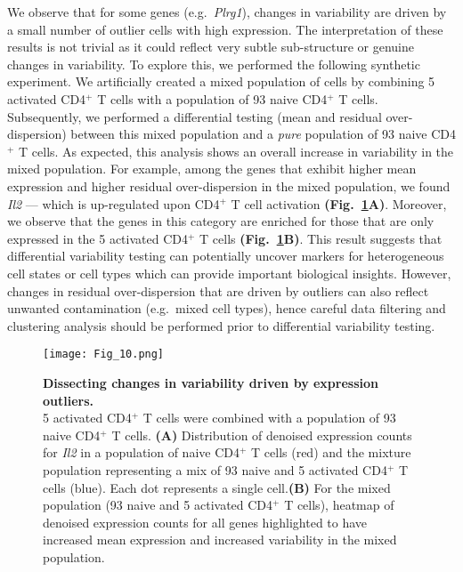 We observe that for some genes (e.g.~\textit{Plrg1}), changes in variability are driven by a small number of outlier cells with high expression. The interpretation of these results is not trivial as it could reflect very subtle sub-structure or genuine changes in variability. To explore this, we performed the following synthetic experiment. We artificially created a mixed population of cells by combining 5 activated CD4$^+$ T cells with a population of 93 naive CD4$^+$ T cells. Subsequently, we performed a differential testing (mean and residual over-dispersion) between this mixed population and a \textit{pure} population of 93 naive CD4$^+$ T cells. As expected, this analysis shows an overall increase in variability in the mixed population. For example, among the genes that exhibit higher mean expression and higher residual over-dispersion in the mixed population, we found \textit{Il2} --- which is up-regulated upon CD4$^+$ T cell activation \textbf{(Fig.~\ref{fig2:mixture_population}A)}. Moreover, we observe that the genes in this category are enriched for those that are only expressed in the 5 activated CD4$^+$ T cells \textbf{(Fig.~\ref{fig2:mixture_population}B)}. This result suggests that differential variability testing can potentially uncover markers for heterogeneous cell states or cell types which can provide important biological insights. However, changes in residual over-dispersion that are driven by outliers can also reflect unwanted contamination 
(e.g.~mixed cell types), hence careful data filtering and clustering analysis should be performed prior to differential variability testing. 

\newpage

\begin{figure}[!h]
\centering
\texttt{[image: Fig\_10.png]}
\caption[Dissecting changes in variability driven by expression outliers]{\textbf{Dissecting changes in variability driven by expression outliers.}\\
5 activated CD4$^+$ T cells were combined with a population of 93 naive CD4$^+$ T cells. \textbf{(A)} Distribution of denoised expression counts for \textit{Il2} in a population of naive CD4$^+$ T cells (red) and the mixture population representing a mix of 93 naive and 5 activated CD4$^+$ T cells (blue). Each dot represents a single cell.\textbf{(B)} For the mixed population (93 naive and 5 activated CD4$^+$ T cells), heatmap of denoised expression counts for all genes highlighted to have increased mean expression and increased variability in the mixed population.}
\label{fig2:mixture_population}
\end{figure}


